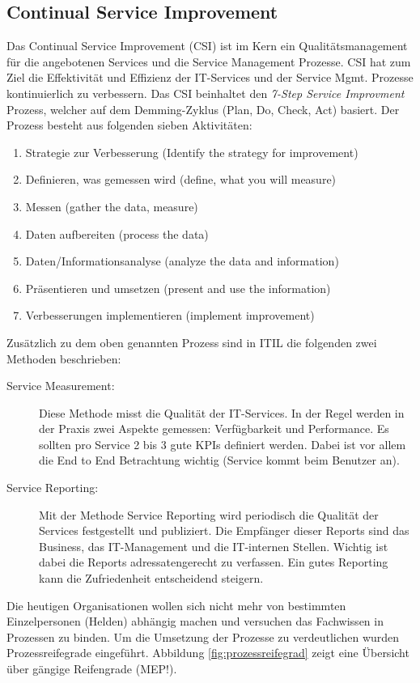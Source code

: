 \subsection{Continual Service Improvement}
Das Continual Service Improvement (CSI) ist im Kern ein Qualitätsmanagement für die angebotenen Services und die Service Management Prozesse. CSI hat zum Ziel die Effektivität und Effizienz der IT-Services und der Service Mgmt. Prozesse kontinuierlich zu verbessern. Das CSI beinhaltet den \emph{7-Step Service Improvment} Prozess, welcher auf dem Demming-Zyklus (Plan, Do, Check, Act) basiert. Der Prozess besteht aus folgenden sieben Aktivitäten:
\begin{enumerate}
	\item Strategie zur Verbesserung (Identify the strategy for improvement)
	\item Definieren, was gemessen wird (define, what you will measure)
	\item Messen (gather the data, measure)
	\item Daten aufbereiten (process the data)
	\item Daten/Informationsanalyse (analyze the data and information)
	\item Präsentieren und umsetzen (present and use the information)
	\item Verbesserungen implementieren (implement improvement)
\end{enumerate}
Zusätzlich zu dem oben genannten Prozess sind in ITIL die folgenden zwei Methoden beschrieben:
\begin{description}
	\item[Service Measurement:] Diese Methode misst die Qualität der IT-Services. In der Regel werden in der Praxis zwei Aspekte gemessen: Verfügbarkeit und Performance. Es sollten pro Service 2 bis 3 gute KPIs definiert werden. Dabei ist vor allem die End to End Betrachtung wichtig (Service kommt beim Benutzer an).
	\item[Service Reporting:] Mit der Methode Service Reporting wird periodisch die Qualität der Services festgestellt und publiziert. Die Empfänger dieser Reports sind das Business, das IT-Management und die IT-internen Stellen. Wichtig ist dabei die Reports adressatengerecht zu verfassen. Ein gutes Reporting kann die Zufriedenheit entscheidend steigern.
\end{description}
Die heutigen Organisationen wollen sich nicht mehr von bestimmten Einzelpersonen (Helden) abhängig machen und versuchen das Fachwissen in Prozessen zu binden. Um die Umsetzung der Prozesse zu verdeutlichen wurden Prozessreifegrade eingeführt. Abbildung \ref{fig:prozessreifegrad} zeigt eine Übersicht über gängige Reifengrade (MEP!).

